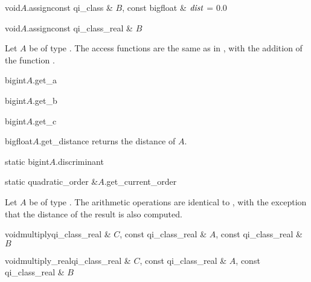 \begin{fcode}{void}{$A$.assign}{const qi_class & $B$, const bigfloat & $\mathit{dist}$ = 0.0}
\end{fcode}

\begin{fcode}{void}{$A$.assign}{const qi_class_real & $B$}
\end{fcode}



\ACCS

Let $A$ be of type .  The access functions are the same as in
, with the addition of the function .

\begin{cfcode}{bigint}{$A$.get_a}{}
\end{cfcode}

\begin{cfcode}{bigint}{$A$.get_b}{}
\end{cfcode}

\begin{cfcode}{bigint}{$A$.get_c}{}
\end{cfcode}

\begin{cfcode}{bigfloat}{$A$.get_distance}{}
  returns the distance of $A$.
\end{cfcode}

\begin{cfcode}{static bigint}{$A$.discriminant}{}
\end{cfcode}

\begin{cfcode}{static quadratic_order &}{$A$.get_current_order}{}
\end{cfcode}



\ARTH

Let $A$ be of type .  The arithmetic operations are identical to
, with the exception that the distance of the result is also computed.

\begin{fcode}{void}{multiply}{qi_class_real & $C$, const qi_class_real & $A$,
    const qi_class_real & $B$}%
\end{fcode}

\begin{fcode}{void}{multiply_real}{qi_class_real & $C$, const qi_class_real & $A$,
    const qi_class_real & $B$}%
\end{fcode}

